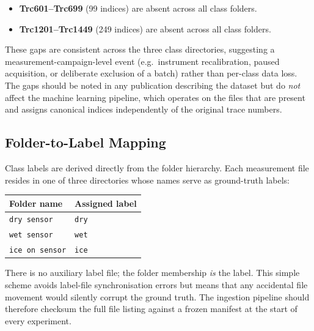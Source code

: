 \begin{itemize}
    \item \textbf{Trc601--Trc699} (\num{99} indices) are absent across
        all class folders.
    \item \textbf{Trc1201--Trc1449} (\num{249} indices) are absent
        across all class folders.
\end{itemize}

These gaps are consistent across the three class directories, suggesting
a measurement-campaign-level event (e.g.\ instrument recalibration,
paused acquisition, or deliberate exclusion of a batch) rather than
per-class data loss.  The gaps should be noted in any publication
describing the dataset but do \emph{not} affect the machine learning
pipeline, which operates on the files that are present and assigns
canonical indices independently of the original trace numbers.

\subsection{Folder-to-Label Mapping}
\label{sec:dataset:labels}

Class labels are derived directly from the folder hierarchy.  Each
measurement file resides in one of three directories whose names serve as
ground-truth labels:

\begin{center}
\begin{tabular}{ll}
    \toprule
    \textbf{Folder name} & \textbf{Assigned label} \\
    \midrule
    \texttt{dry sensor}    & \texttt{dry} \\
    \texttt{wet sensor}    & \texttt{wet} \\
    \texttt{ice on sensor} & \texttt{ice} \\
    \bottomrule
\end{tabular}
\end{center}

\noindent
There is no auxiliary label file; the folder membership \emph{is} the
label.  This simple scheme avoids label-file synchronisation errors but
means that any accidental file movement would silently corrupt the
ground truth.  The ingestion pipeline should therefore checksum the full
file listing against a frozen manifest at the start of every experiment.

